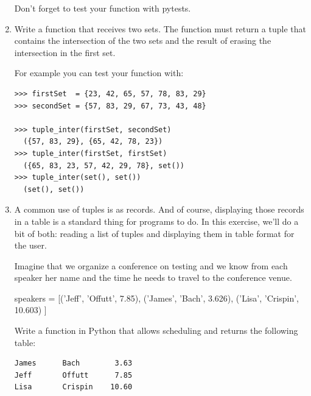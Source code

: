 \documentclass[
  fontsize=10pt,
  a4paper,
]{scrartcl}
\newcommand\solucion[1]{}
\begin{document}
\begin{enumerate}
Don't forget to test your function with pytests.


\item Write a  function that receives two sets. The function must return a tuple that contains the intersection of the two sets and the result of erasing the intersection in the first set.

For example you can test your function with:

\begin{Verbatim}[frame=single]
>>> firstSet  = {23, 42, 65, 57, 78, 83, 29}
>>> secondSet = {57, 83, 29, 67, 73, 43, 48}

>>> tuple_inter(firstSet, secondSet)
  ({57, 83, 29}, {65, 42, 78, 23})
>>> tuple_inter(firstSet, firstSet)
  ({65, 83, 23, 57, 42, 29, 78}, set())
>>> tuple_inter(set(), set())
  (set(), set())
\end{Verbatim}


\solucion{
firstSet  = {23, 42, 65, 57, 78, 83, 29}
secondSet = {57, 83, 29, 67, 73, 43, 48}

print("First Set ", firstSet)
print("Second Set ", secondSet)

intersection = firstSet.intersection(secondSet)
print("Intersection is ", intersection)
for item in intersection:
  firstSet.remove(item)

print("First Set after removing common element ", firstSet)

}

\item A common use of tuples is as records.
And of course, displaying those records in a table is a standard thing for programs to do. In this exercise, we'll do a bit of both: reading a list of tuples and displaying them
in table format for the user.

Imagine that we organize a conference on testing and we know from each speaker her name and the time he needs to travel to the conference venue.

\begin{python}
speakers = [('Jeff', 'Offutt', 7.85),
            ('James', 'Bach', 3.626),
            ('Lisa', 'Crispin', 10.603)
          ]
\end{python}

Write a  function in Python that allows scheduling and returns the following table:

\begin{Verbatim}
James      Bach        3.63
Jeff       Offutt      7.85
Lisa       Crispin    10.60
\end{Verbatim}


\end{enumerate}
\end{document}
